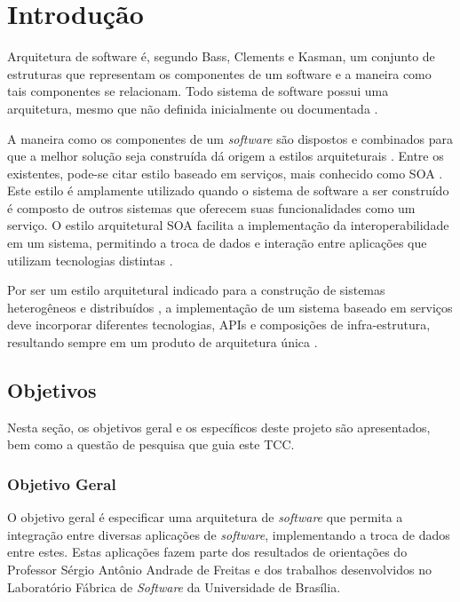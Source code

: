 \chapter[Introdução]{Introdução}
Arquitetura de software é, segundo Bass, Clements e Kasman\cite{bass_software_archi_practice_2003}, um conjunto de estruturas que representam os componentes de um software e a maneira como tais componentes se relacionam. Todo sistema de software possui uma arquitetura, mesmo que não definida inicialmente ou documentada \cite{bass_software_archi_practice_2003}.

A maneira como os componentes de um \textit{software} são dispostos e combinados para que a melhor solução seja construída dá origem a estilos arquiteturais \cite{pressman2006engenharia}. Entre os existentes, pode-se citar estilo baseado em serviços, mais conhecido como SOA \cite{josuttis_soa_2007}. Este estilo é amplamente utilizado quando o sistema de software a ser construído é composto de outros sistemas que oferecem suas funcionalidades como um serviço. O estilo arquitetural SOA facilita a implementação da interoperabilidade em um sistema, permitindo a troca de dados e interação entre aplicações que utilizam tecnologias distintas \cite{oqueesoa_2010}.

Por ser um estilo arquitetural indicado para a construção de sistemas heterogêneos e distribuídos \cite{josuttis_soa_2007}, a implementação de um sistema baseado em serviços deve incorporar diferentes tecnologias, APIs e composições de infra-estrutura, resultando sempre em um produto de arquitetura única \cite{erl_orientacaoaservico_2009}.

\section{Objetivos}

Nesta seção, os objetivos geral e os específicos deste projeto são apresentados, bem como a questão de pesquisa que guia este TCC.

\subsection{Objetivo Geral}
O objetivo geral é especificar uma arquitetura de \textit{software} que permita a integração entre diversas aplicações de \textit{software}, implementando a troca de dados entre estes. Estas aplicações fazem parte dos resultados de orientações do Professor Sérgio Antônio Andrade de Freitas e dos trabalhos desenvolvidos no Laboratório Fábrica de \textit{Software} da Universidade de Brasília.

